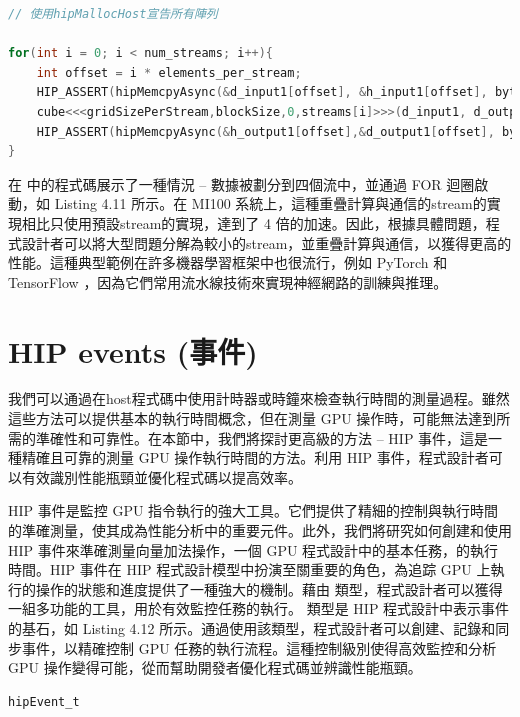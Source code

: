 \begin{lstlisting}[language=C, caption={使用HIP streams呈現重疊計算與通信的host端程式碼}, label={11th:example}]
// 使用hipMallocHost宣告所有陣列

for(int i = 0; i < num_streams; i++){
    int offset = i * elements_per_stream;
    HIP_ASSERT(hipMemcpyAsync(&d_input1[offset], &h_input1[offset], bytes_per_stream, hipMemcpyHostToDevice, stream[i]);
    cube<<<gridSizePerStream,blockSize,0,streams[i]>>>(d_input1, d_output1,offset);
    HIP_ASSERT(hipMemcpyAsync(&h_output1[offset],&d_output1[offset], bytes_per_stream, hipMemcpyDeviceToHost,streams[i]));
}
\end{lstlisting}

在 中的程式碼展示了一種情況 -- 數據被劃分到四個流中，並通過 FOR 迴圈啟動，如 Listing 4.11 所示。在 MI100 系統上，這種重疊計算與通信的stream的實現相比只使用預設stream的實現，達到了 4 倍的加速。因此，根據具體問題，程式設計者可以將大型問題分解為較小的stream，並重疊計算與通信，以獲得更高的性能。這種典型範例在許多機器學習框架中也很流行，例如 PyTorch \cite{62} 和 TensorFlow \cite{1}，因為它們常用流水線技術來實現神經網路的訓練與推理。

\section{HIP events (事件)}
我們可以通過在host程式碼中使用計時器或時鐘來檢查執行時間的測量過程。雖然這些方法可以提供基本的執行時間概念，但在測量 GPU 操作時，可能無法達到所需的準確性和可靠性。在本節中，我們將探討更高級的方法 -- HIP 事件，這是一種精確且可靠的測量 GPU 操作執行時間的方法。利用 HIP 事件，程式設計者可以有效識別性能瓶頸並優化程式碼以提高效率。

HIP 事件是監控 GPU 指令執行的強大工具。它們提供了精細的控制與執行時間的準確測量，使其成為性能分析中的重要元件。此外，我們將研究如何創建和使用 HIP 事件來準確測量向量加法操作，一個 GPU 程式設計中的基本任務，的執行時間。HIP 事件在 HIP 程式設計模型中扮演至關重要的角色，為追踪 GPU 上執行的操作的狀態和進度提供了一種強大的機制。藉由 類型，程式設計者可以獲得一組多功能的工具，用於有效監控任務的執行。 類型是 HIP 程式設計中表示事件的基石，如 Listing 4.12 所示。通過使用該類型，程式設計者可以創建、記錄和同步事件，以精確控制 GPU 任務的執行流程。這種控制級別使得高效監控和分析 GPU 操作變得可能，從而幫助開發者優化程式碼並辨識性能瓶頸。

\begin{lstlisting}[language=C, caption={使用hipEvent\_t 型別}, label={12th:example}]
hipEvent_t
\end{lstlisting}

